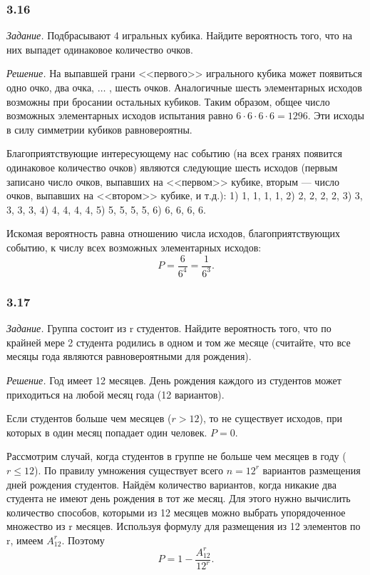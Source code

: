 \subsubsection*{3.16}

\textit{Задание.} Подбрасывают 4 игральных кубика.
Найдите вероятность того, что на них выпадет одинаковое количество очков.

\textit{Решение.} На выпавшей грани <<первого>> игрального кубика может появиться одно очко, два очка,  $ \dotsc $ , шесть очков.
Аналогичные шесть элементарных исходов возможны при бросании остальных кубиков.
Таким образом, общее число возможных элементарных исходов испытания равно $ 6 \cdot 6 \cdot 6 \cdot 6 = 1296 $.
Эти исходы в силу симметрии кубиков равновероятны.

Благоприятствующие интересующему нас событию
(на всех гранях появится одинаковое количество очков)
являются следующие шесть исходов
(первым записано число очков,
выпавших на <<первом>> кубике,
вторым --- число очков, выпавших на <<втором>> кубике, и т.д.): 1) 1, 1, 1, 1, 2) 2, 2, 2, 2, 3) 3, 3, 3, 3, 4) 4, 4, 4, 4, 5) 5, 5, 5, 5, 6) 6, 6, 6, 6.

Искомая вероятность равна отношению числа исходов, благоприятствующих событию, к числу всех возможных элементарных исходов:
$$ P =
\frac{6}{6^4} = \frac{1}{6^3}.$$

\subsubsection*{3.17}

\textit{Задание.} Группа состоит из r студентов.
Найдите вероятность того, что по крайней мере 2 студента родились в одном и том же месяце (считайте, что все месяцы года являются равновероятными для рождения).

\textit{Решение.} Год имеет 12 месяцев.
День рождения каждого из студентов может приходиться на любой месяц года (12 вариантов).

Если студентов больше чем месяцев ($ r > 12 $), то не существует исходов, при которых в один месяц попадает один человек.
$ P = 0 $.

Рассмотрим случай, когда студентов в группе не больше чем месяцев в году ($ r \leq 12 $).
По правилу умножения существует всего $ n = 12^r $ вариантов размещения дней рождения студентов.
Найдём количество вариантов, когда никакие два студента не имеют день рождения в тот же месяц.
Для этого нужно вычислить количество способов, которыми из 12 месяцев можно выбрать упорядоченное множество из r месяцев.
Используя формулу для размещения из 12 элементов по r, имеем $ A_{12}^r $.
Поэтому
$$ P =
1 - \frac{ A_{ 12 }^r }{ 12^r }.$$

